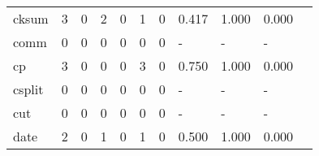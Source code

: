 \begin{longtable}{lp{1.20cm}p{1.20cm}p{1.20cm}p{1.20cm}p{1.20cm}p{1.20cm}p{1.20cm}p{1.20cm}p{1.20cm}p{1.20cm}}
cksum     &                                     3 &                                                  0 &                                                  2 &                                                  0 &                                                  1 &                                                  0 &                                         0.417 &                                              1.000 &                                              0.000 \\
comm      &                                     0 &                                                  0 &                                                  0 &                                                  0 &                                                  0 &                                                  0 &                                             - &                                                  - &                                                  - \\
cp        &                                     3 &                                                  0 &                                                  0 &                                                  0 &                                                  3 &                                                  0 &                                         0.750 &                                              1.000 &                                              0.000 \\
csplit    &                                     0 &                                                  0 &                                                  0 &                                                  0 &                                                  0 &                                                  0 &                                             - &                                                  - &                                                  - \\
cut       &                                     0 &                                                  0 &                                                  0 &                                                  0 &                                                  0 &                                                  0 &                                             - &                                                  - &                                                  - \\
date      &                                     2 &                                                  0 &                                                  1 &                                                  0 &                                                  1 &                                                  0 &                                         0.500 &                                              1.000 &                                              0.000 \\

\end{longtable}
